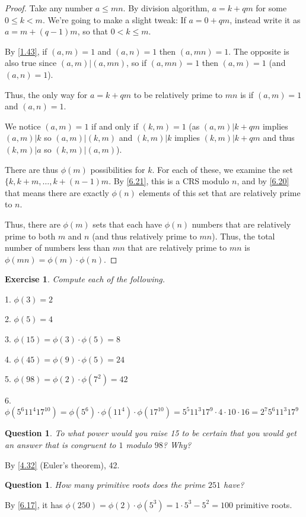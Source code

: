 \documentclass{article}
\newtheorem{ques}[thm]{Question}
\newtheorem{ex}[thm]{Exercise}
\numberwithin{equation}{thm}
\begin{document}
\begin{proof}
  Take any number $a \leq mn$. By division algorithm, $a = k + qm$ for some $0 \leq k < m$. We're going to make a slight tweak: If $a = 0 + qm$, instead write it as $a = m + (q-1)m$, so that $0 < k \leq m$.

  By \ref{1.43}, if $(a, m) = 1$ and $(a, n) = 1$ then $(a, mn) = 1$. The opposite is also true since $(a, m) | (a, mn)$, so if $(a, mn) = 1$ then $(a, m) = 1$ (and $(a, n) = 1$).

  Thus, the only way for $a = k + qm$ to be relatively prime to $mn$ is if $(a, m) = 1$ and $(a, n) = 1$.

  We notice $(a, m) = 1$ if and only if $(k, m) = 1$ (as $(a, m) | k + qm$ implies $(a, m) | k$ so $(a, m) | (k, m)$ and $(k, m) | k$ implies $(k, m) | k + qm$ and thus $(k, m) | a$ so $(k, m) | (a, m)$).

  There are thus $\phi(m)$ possibilities for $k$. For each of these, we examine the set $\{k, k + m, \ldots, k + (n-1)m$. By \ref{6.21}, this is a CRS modulo $n$, and by \ref{6.20} that means there are exactly $\phi(n)$ elements of this set that are relatively prime to $n$.

  Thus, there are $\phi(m)$ sets that each have $\phi(n)$ numbers that are relatively prime to both $m$ and $n$ (and thus relatively prime to $mn$). Thus, the total number of numbers less than $mn$ that are relatively prime to $mn$ is $\phi(mn) = \phi(m) \cdot \phi(n)$.
\end{proof}



\begin{ex} \label{6.24}
  Compute each of the following.
\end{ex}

1. $\phi(3) = 2$

2. $\phi(5) = 4$

3. $\phi(15) = \phi(3) \cdot \phi(5) = 8$

4. $\phi(45) = \phi(9) \cdot \phi(5) = 24$

5. $\phi(98) = \phi(2) \cdot \phi(7^2) = 42$

6. $\phi(5^6 11^4 17^{10}) = \phi(5^6) \cdot \phi(11^4) \cdot \phi(17^{10}) = 5^5 11^3 17^9 \cdot 4 \cdot 10 \cdot 16 = 2^7 5^6 11^3 17^9$



\begin{ques} \label{6.25}
  To what power would you raise 15 to be certain that you would get an answer that is congruent to $1$ modulo $98$? Why?
\end{ques}

By \ref{4.32} (Euler's theorem), 42.



\begin{ques} \label{6.26}
  How many primitive roots does the prime $251$ have?
\end{ques}

By \ref{6.17}, it has $\phi(250) = \phi(2) \cdot \phi(5^3) = 1 \cdot 5^3 - 5^2 = 100$ primitive roots.
\end{document}
